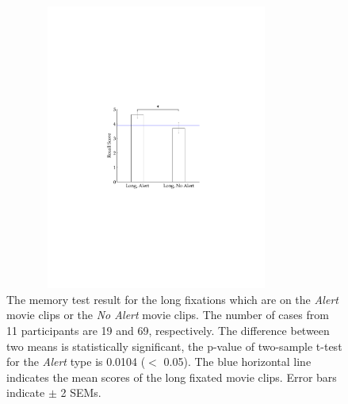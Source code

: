 \documentclass[oneside,master]{snueethesis}
\begin{document}
\begin{figure}
  \centerline{\includegraphics[width=100mm,height=94mm,trim=54mm 90mm 54mm 90mm]{./eps/memtest_long.pdf}}
  \caption[The memory test result for the long fixations which are on Alert movie clips or No Alert movie clips]{The memory test result for the long fixations which are on the \textit{Alert} movie clips or the \textit{No Alert} movie clips. The number of cases from 11 participants are 19 and 69, respectively. The difference between two means is statistically significant, the p-value of two-sample t-test for the \textit{Alert} type is 0.0104 ($<$ 0.05). The blue horizontal line indicates the mean scores of the long fixated movie clips. Error bars indicate $\pm$ 2 SEMs.}
  \label{fig:memtest-long}
\end{figure}
\end{document}
